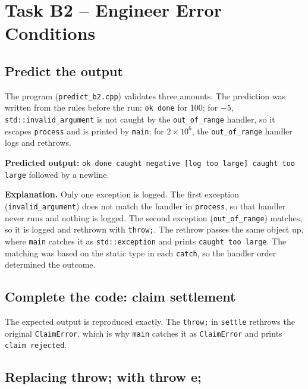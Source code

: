 \documentclass[11pt,a4paper]{article}
\newcommand{\lstout}[2]{}
\begin{document}
\section{Task B2 -- Engineer Error Conditions}
\subsection*{Predict the output}
The program (\texttt{predict\_b2.cpp}) validates three amounts. The prediction was written from the rules before the run: \texttt{ok done} for 100; for $-5$, \texttt{std::invalid\_argument} is not caught by the \texttt{out\_of\_range} handler, so it escapes \texttt{process} and is printed by \texttt{main}; for $2 \times 10^6$, the \texttt{out\_of\_range} handler logs and rethrows.

\textbf{Predicted output:} \texttt{ok done caught negative [log too large] caught too large} followed by a newline.

\lstout{../Task04_ErrorHandling/predict_b2.out}{Actual output of predict\_b2}

\textbf{Explanation.} Only one exception is logged. The first exception (\texttt{invalid\_argument}) does not match the handler in \texttt{process}, so that handler never runs and nothing is logged. The second exception (\texttt{out\_of\_range}) matches, so it is logged and rethrown with \texttt{throw;}. The rethrow passes the same object up, where \texttt{main} catches it as \texttt{std::exception} and prints \texttt{caught too large}. The matching was based on the static type in each \texttt{catch}, so the handler order determined the outcome.

\subsection*{Complete the code: claim settlement}
\lstout{../Task04_ErrorHandling/claim_settle.cpp}{claim\_settle.cpp with TODO 1 and TODO 2 completed}

\lstout{../Task04_ErrorHandling/claim_settle.out}{Output: matches the expected output of the assignment}

The expected output is reproduced exactly. The \texttt{throw;} in \texttt{settle} rethrows the original \texttt{ClaimError}, which is why \texttt{main} catches it as \texttt{ClaimError} and prints \texttt{claim rejected}.

\subsection*{Replacing throw; with throw e;}
\lstout{../Task04_ErrorHandling/claim_settle_throw_e.out}{Output with throw e;}
\end{document}
